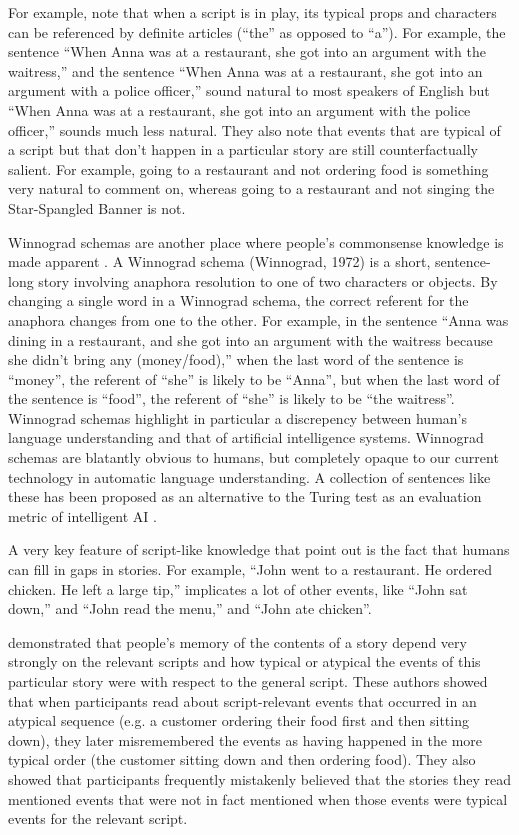 \documentclass[10pt,a4paper]{article}
\begin{document}
For example,  note that when a script is in play, its typical props and characters can be referenced by definite articles (“the” as opposed to “a”). For example, the sentence “When Anna was at a restaurant, she got into an argument with the waitress,” and the sentence “When Anna was at a restaurant, she got into an argument with a police officer,” sound natural to most speakers of English but “When Anna was at a restaurant, she got into an argument with the police officer,” sounds much less natural. They also note that events that are typical of a script but that don’t happen in a particular story are still counterfactually salient. For example, going to a restaurant and not ordering food is something very natural to comment on, whereas going to a restaurant and not singing the Star-Spangled Banner is not.

Winnograd schemas are another place where people's commonsense knowledge is made apparent \cite{winograd1972understanding}.
A Winnograd schema (Winnograd, 1972) is a short, sentence-long story involving anaphora resolution to one of two characters or objects. By changing a single word in a Winnograd schema, the correct referent for the anaphora changes from one to the other. For example, in the sentence “Anna was dining in a restaurant, and she got into an argument with the waitress because she didn’t bring any (money/food),” when the last word of the sentence is “money”, the referent of “she” is likely to be “Anna”, but when the last word of the sentence is “food”, the referent of “she” is likely to be “the waitress”.
Winnograd schemas highlight in particular a discrepency between human's language understanding and that of artificial intelligence systems.
Winnograd schemas are blatantly obvious to humans, but completely opaque to our current technology in automatic language understanding.
A collection of sentences like these has been proposed as an alternative to the Turing test as an evaluation metric of intelligent AI \cite{levesque2011winograd}.

A very key feature of script-like knowledge that  point out is the fact that humans can fill in gaps in stories. For example, “John went to a restaurant. He ordered chicken. He left a large tip,” implicates a lot of other events, like “John sat down,” and “John read the menu,” and “John ate chicken”.

 demonstrated that people’s memory of the contents of a story depend very strongly on the relevant scripts and how typical or atypical the events of this particular story were with respect to the general script. These authors showed that when participants read about script-relevant events that occurred in an atypical sequence (e.g. a customer ordering their food first and then sitting down), they later misremembered the events as having happened in the more typical order (the customer sitting down and then ordering food). They also showed that participants frequently mistakenly believed that the stories they read mentioned events that were not in fact mentioned when those events were typical events for the relevant script.
\end{document}
